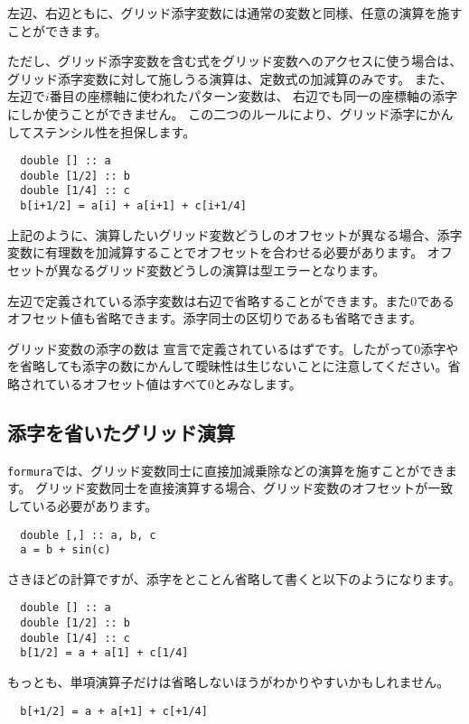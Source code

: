 \documentclass{jsarticle}
\newcommand{\formura}{{\texttt{formura}}}
\begin{document}
左辺、右辺ともに、グリッド添字変数には通常の変数と同様、任意の演算を施すことができます。

ただし、グリッド添字変数を含む式をグリッド変数へのアクセスに使う場合は、
グリッド添字変数に対して施しうる演算は、定数式の加減算のみです。
また、左辺で$i$番目の座標軸に使われたパターン変数は、
右辺でも同一の座標軸の添字にしか使うことができません。
この二つのルールにより、グリッド添字にかんしてステンシル性を担保します。

\begin{lstlisting}
  double [] :: a
  double [1/2] :: b
  double [1/4] :: c
  b[i+1/2] = a[i] + a[i+1] + c[i+1/4]
\end{lstlisting}

上記のように、演算したいグリッド変数どうしのオフセットが異なる場合、添字変数に有理数を加減算することでオフセットを合わせる必要があります。
オフセットが異なるグリッド変数どうしの演算は型エラーとなります。

左辺で定義されている添字変数は右辺で省略することができます。また0であるオフセット値も省略できます。添字同士の区切りである\lit{,}も省略できます。


グリッド変数の添字の数は
宣言で定義されているはずです。したがって0添字や\lit{,}を省略しても添字の数にかんして曖昧性は生じないことに注意してください。省略されているオフセット値はすべて0とみなします。


\subsection{添字を省いたグリッド演算}

\formura では、グリッド変数同士に直接加減乗除などの演算を施すことができます。
グリッド変数同士を直接演算する場合、グリッド変数のオフセットが一致している必要があります。

\begin{lstlisting}
  double [,] :: a, b, c
  a = b + sin(c)
\end{lstlisting}

さきほどの計算ですが、添字をとことん省略して書くと以下のようになります。

\begin{lstlisting}
  double [] :: a
  double [1/2] :: b
  double [1/4] :: c
  b[1/2] = a + a[1] + c[1/4]
\end{lstlisting}

もっとも、単項\lit{+}演算子だけは省略しないほうがわかりやすいかもしれません。
\begin{lstlisting}
  b[+1/2] = a + a[+1] + c[+1/4]
\end{lstlisting}
\end{document}
